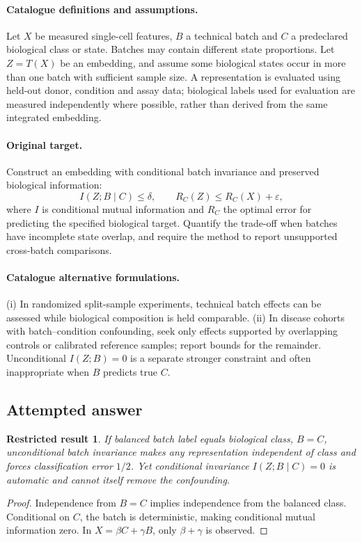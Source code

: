 \documentclass[11pt]{article}
\newtheorem{attemptresult}{Restricted result}[section]
\begin{document}
\paragraph{Catalogue definitions and assumptions.}
Let $X$ be measured single-cell features, $B$ a technical batch and $C$ a predeclared biological class or state. Batches may contain different state proportions. Let $Z=T(X)$ be an embedding, and assume some biological states occur in more than one batch with sufficient sample size. A representation is evaluated using held-out donor, condition and assay data; biological labels used for evaluation are measured independently where possible, rather than derived from the same integrated embedding.
\paragraph{Original target.}
Construct an embedding with conditional batch invariance and preserved biological information:
\[I(Z;B\mid C)\le\delta,\qquad R_C(Z)\le R_C(X)+\varepsilon,\]
where $I$ is conditional mutual information and $R_C$ the optimal error for predicting the specified biological target. Quantify the trade-off when batches have incomplete state overlap, and require the method to report unsupported cross-batch comparisons.
\paragraph{Catalogue alternative formulations.}
(i) In randomized split-sample experiments, technical batch effects can be assessed while biological composition is held comparable. (ii) In disease cohorts with batch--condition confounding, seek only effects supported by overlapping controls or calibrated reference samples; report bounds for the remainder. Unconditional $I(Z;B)=0$ is a separate stronger constraint and often inappropriate when $B$ predicts true $C$.
\subsection{Attempted answer}
\begin{attemptresult}
If balanced batch label equals biological class, $B=C$, unconditional batch invariance makes any representation independent of class and forces classification error $1/2$. Yet conditional invariance $I(Z;B\mid C)=0$ is automatic and cannot itself remove the confounding.
\end{attemptresult}
\begin{proof}
Independence from $B=C$ implies independence from the balanced class. Conditional on $C$, the batch is deterministic, making conditional mutual information zero. In $X=\beta C+\gamma B$, only $\beta+\gamma$ is observed.
\end{proof}
\end{document}

